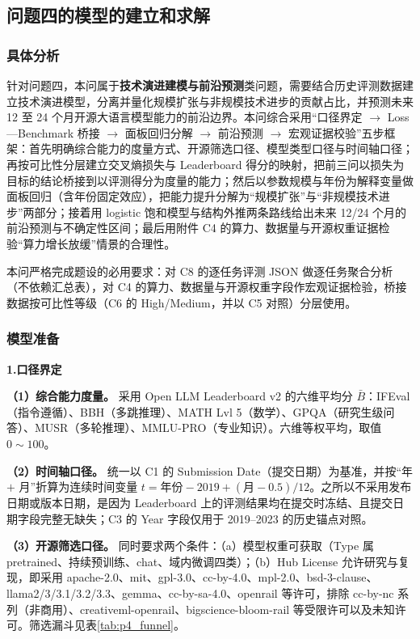 \subsection{问题四的模型的建立和求解}

\subsubsection{具体分析}

针对问题四，本问属于\textbf{技术演进建模与前沿预测}类问题，需要结合历史评测数据建立技术演进模型，分离并量化规模扩张与非规模技术进步的贡献占比，并预测未来 12 至 24 个月开源大语言模型能力的前沿边界\cite{wei2022emergent}。本问综合采用“口径界定 $\to$ Loss—Benchmark 桥接 $\to$ 面板回归分解 $\to$ 前沿预测 $\to$ 宏观证据校验”五步框架：首先明确综合能力的度量方式、开源筛选口径、模型类型口径与时间轴口径；再按可比性分层建立交叉熵损失与 Leaderboard 得分的映射，把前三问以损失为目标的结论桥接到以评测得分为度量的能力；然后以参数规模与年份为解释变量做面板回归（含年份固定效应），把能力提升分解为“规模扩张”与“非规模技术进步”两部分；接着用 logistic 饱和模型与结构外推两条路线给出未来 12/24 个月的前沿预测与不确定性区间；最后用附件 C4 的算力、数据量与开源权重证据检验“算力增长放缓”情景的合理性。

本问严格完成题设的必用要求：对 C8 的逐任务评测 JSON 做逐任务聚合分析（不依赖汇总表），对 C4 的算力、数据量与开源权重字段作宏观证据检验，桥接数据按可比性等级（C6 的 High/Medium，并以 C5 对照）分层使用。

\subsubsection{模型准备}

\textbf{1.口径界定}

\textbf{（1）综合能力度量。} 采用 Open LLM Leaderboard v2 的六维平均分 $\bar B$：IFEval（指令遵循）、BBH（多跳推理）、MATH Lvl 5（数学）、GPQA（研究生级问答）、MUSR（多轮推理）、MMLU-PRO（专业知识）。六维等权平均，取值 $0\sim100$。

\textbf{（2）时间轴口径。} 统一以 C1 的 Submission Date（提交日期）为基准，并按“年 $+$ 月”折算为连续时间变量 $t=\text{年份}-2019+(\text{月}-0.5)/12$。之所以不采用发布日期或版本日期，是因为 Leaderboard 上的评测结果均在提交时冻结、且提交日期字段完整无缺失；C3 的 Year 字段仅用于 2019--2023 的历史锚点对照。

\textbf{（3）开源筛选口径。} 同时要求两个条件：（a）模型权重可获取（Type 属 pretrained、持续预训练、chat、域内微调四类）；（b）Hub License 允许研究与复现，即采用 apache-2.0、mit、gpl-3.0、cc-by-4.0、mpl-2.0、bsd-3-clause、llama2/3/3.1/3.2/3.3、gemma、cc-by-sa-4.0、openrail 等许可，排除 cc-by-nc 系列（非商用）、creativeml-openrail、bigscience-bloom-rail 等受限许可以及未知许可。筛选漏斗见表\ref{tab:p4_funnel}。

